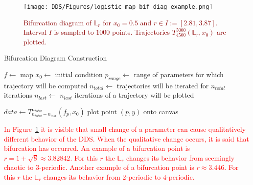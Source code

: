 \begin{figure}[!h]
    \centering
    \texttt{[image: DDS/Figures/logistic\_map\_bif\_diag\_example.png]}
    \caption{
        \textcolor{darkred}{
        Bifurcation diagram of $\mathbb{L}_{r}$ for $x_0 = 0.5$ and $r \in I := [ 2.81, 3.87 ]$. 
        Interval $I$ is sampled to $1000$ points. 
        Trajectories $T_{4500}^{5000}(\mathbb{L}_{r}, x_0)$ are plotted.
        }
    }
    \label{fig:bif_diag_example}
\end{figure}

\begin{algorithm}
\caption{Bifurcation Diagram Construction}\label{bif_diag_alg}
\begin{algorithmic}[1]
\Statex $f \gets$ map
\Statex $x_0 \gets$ initial condition
\Statex $p_{range} \gets$ range of parameters for which trajectory will be computed
\Statex $n_{total} \gets$ trajectories will be iterated for $n_{total}$ iterations
\Statex $n_{last} \gets$ $n_{last}$ iterations of a trajectory will be plotted

    \State $data \leftarrow T_{n_{total}-n_{last}}^{n_{total}}(f_p, x_0)$
        \State plot point $(p, y)$ onto canvas
    \EndFor
\EndFor

\end{algorithmic}
\end{algorithm}

\begin{remark}
    \textcolor{red}{
    In Figure~\ref{fig:bif_diag_example} it is visible that small change of a parameter can cause qualitatively different behavior of the DDS.
    When the qualitative change occurs, it is said that bifurcation has occurred.
    An example of a bifurcation point is $r = 1+\sqrt{8} \approx 3.82842$. For this $r$ the $\mathbb{L}_{r}$ changes its behavior from seemingly chaotic to $3$-periodic. 
    Another example of a bifurcation point is $r \approx 3.446$. For this $r$ the $\mathbb{L}_{r}$ changes its behavior from $2$-periodic to $4$-periodic.
    }
\end{remark}